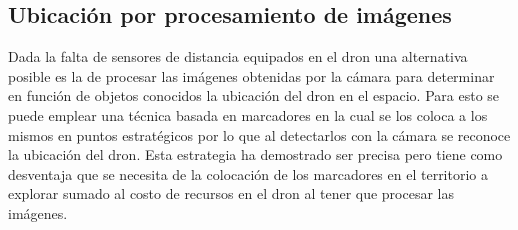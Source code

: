 \subsection {Ubicación por procesamiento de imágenes}
Dada la falta de sensores de distancia equipados en el dron una alternativa posible es la de procesar las imágenes obtenidas por la cámara para determinar en función de objetos conocidos la ubicación del dron en el espacio.
Para esto se puede emplear una técnica basada en marcadores en la cual se los coloca a los mismos en puntos estratégicos por lo que al detectarlos con la cámara se reconoce la ubicación del dron.
Esta estrategia ha demostrado ser precisa pero tiene como desventaja que se necesita de la colocación de los marcadores en el territorio a explorar sumado al costo de recursos en el dron al tener que procesar las imágenes.
